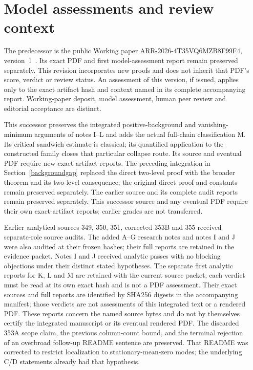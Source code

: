 \documentclass[11pt]{article}
\begin{document}
\section{Model assessments and review context}
The predecessor is the public Working paper ARR-2026-4T35VQ6MZB8F99F4, version~1~\cite{predecessor}. Its exact PDF and first model-assessment report remain preserved separately. This revision incorporates new proofs and does not inherit that PDF's score, verdict or review status. An assessment of this version, if issued, applies only to the exact artifact hash and context named in its complete accompanying report. Working-paper deposit, model assessment, human peer review and editorial acceptance are distinct.

This successor preserves the integrated positive-background and vanishing-minimum arguments of notes I--L and adds the actual full-chain classification M. Its critical sandwich estimate is classical; its quantified application to the constructed family closes that particular collapse route. Its source and eventual PDF require new exact-artifact reports. The preceding integration in Section~\ref{backgroundgap} replaced the direct two-level proof with the broader theorem and its two-level consequence; the original direct proof and constants remain preserved separately. The earlier source and its complete audit reports remain preserved separately. This successor source and any eventual PDF require their own exact-artifact reports; earlier grades are not transferred.

Earlier analytical sources 349, 350, 351, corrected 353B and 355 received separate-role source audits. The added A--G research notes and notes I and J were also audited at their frozen hashes; their full reports are retained in the evidence packet. Notes I and J received analytic passes with no blocking objections under their distinct stated hypotheses. The separate first analytic reports for K, L and M are retained with the current source packet; each verdict must be read at its own exact hash and is not a PDF assessment. Their exact sources and full reports are identified by SHA256 digests in the accompanying manifest; those verdicts are not assessments of this integrated text or a rendered PDF. These reports concern the named source bytes and do not by themselves certify the integrated manuscript or its eventual rendered PDF. The discarded 353A scope claim, the previous column-count bound, and the terminal rejection of an overbroad follow-up README sentence are preserved. That README was corrected to restrict localization to stationary-mean-zero modes; the underlying C/D statements already had that hypothesis.
\end{document}
